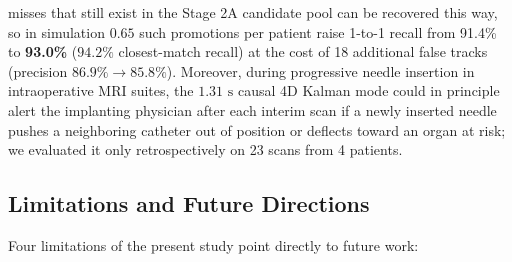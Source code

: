 \documentclass[
  11pt,
]{article}
\begin{document}
\begin{enumerate}
  misses that still exist in the Stage 2A candidate pool can be
  recovered this way, so in simulation \(0.65\) such promotions per
  patient raise 1-to-1 recall from 91.4\% to \textbf{93.0\%} (\(94.2\%\)
  closest-match recall) at the cost of 18 additional false tracks
  (precision \(86.9\% \to 85.8\%\)). Moreover, during progressive needle
  insertion in intraoperative MRI suites, the \(1.31\text{ s}\) causal
  4D Kalman mode could in principle alert the implanting physician after
  each interim scan if a newly inserted needle pushes a neighboring
  catheter out of position or deflects toward an organ at risk; we
  evaluated it only retrospectively on 23 scans from 4 patients.
\end{enumerate}

\subsection{Limitations and Future
Directions}\label{limitations-and-future-directions}

Four limitations of the present study point directly to future work:
\end{document}
